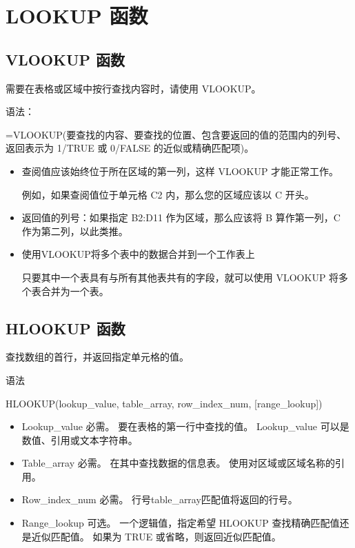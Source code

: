 \section{LOOKUP 函数}
\subsection{VLOOKUP 函数}

需要在表格或区域中按行查找内容时，请使用 VLOOKUP。

语法：

=VLOOKUP(要查找的内容、要查找的位置、包含要返回的值的范围内的列号、返回表示为 1/TRUE 或 0/FALSE 的近似或精确匹配项)。

\begin{itemize}
    \item 查阅值应该始终位于所在区域的第一列，这样 VLOOKUP 才能正常工作。 
    
    例如，如果查阅值位于单元格 C2 内，那么您的区域应该以 C 开头。
    \item 返回值的列号：如果指定 B2:D11 作为区域，那么应该将 B 算作第一列，C 作为第二列，以此类推。
    \item 使用VLOOKUP将多个表中的数据合并到一个工作表上
    
    只要其中一个表具有与所有其他表共有的字段，就可以使用 VLOOKUP 将多个表合并为一个表。
\end{itemize}

\subsection{HLOOKUP 函数}

查找数组的首行，并返回指定单元格的值。

语法

HLOOKUP(lookup\_value, table\_array, row\_index\_num, [range\_lookup])

\begin{itemize}
    \item Lookup\_value    必需。 要在表格的第一行中查找的值。 Lookup\_value 可以是数值、引用或文本字符串。
    \item Table\_array    必需。 在其中查找数据的信息表。 使用对区域或区域名称的引用。
    \item Row\_index\_num    必需。 行号table\_array匹配值将返回的行号。
    \item Range\_lookup    可选。 一个逻辑值，指定希望 HLOOKUP 查找精确匹配值还是近似匹配值。 如果为 TRUE 或省略，则返回近似匹配值。
\end{itemize}

